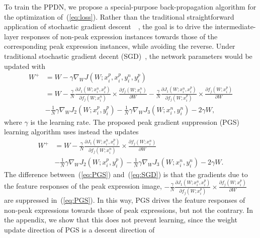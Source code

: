 \documentclass[runningheads]{llncs}
\begin{document}
To train the PPDN, we propose a special-purpose back-propagation algorithm 
 for the optimization of~(\ref{eq:loss}). Rather than the traditional 
straightforward application of stochastic gradient 
descent~\cite{chopra2005learning}~\cite{schroff2015facenet}, the goal is to 
drive the intermediate-layer responses of non-peak expression instances 
towards those of the corresponding peak expression instances, while avoiding 
the reverse. Under traditional stochastic gradient decent 
(SGD)~\cite{bottou2010large}, the network parameters would be updated
with
\begin{equation}
\begin{split}
W^{+} &= W - \gamma \nabla_W J(W; x^p_{i},x^p_{i},y^n_{i},y^p_i)\\
  &= W -\frac{\gamma}{N}\frac{\partial J_{1}(W; x^n_{i},x^p_{i})}{\partial f_{j}(W;x^n_{i})}\times\frac{\partial f_{j}(W;x^n_{i})}{\partial W} - \frac{\gamma
}{N}\frac{\partial J_{1}(W; x^n_{i},x^p_{i})}{\partial f_{j}(W;x^p_{i})}\times\frac{\partial f_{j}(W;x^p_{i})}{\partial W} \\
 & - \frac{1}{N}\gamma \nabla_W J_{2}(W; x^p_{i},y^p_{i})
 - \frac{1}{N}\gamma \nabla_W J_{3}(W;x^n_{i},y^n_{i})
  - 2\gamma W,
\label{eq:SGD}
\end{split}
\end{equation}
where $\gamma$ is the learning rate. The proposed
peak gradient suppression (PGS) learning algorithm
uses instead the updates
 \begin{equation}
 \begin{split}
W^{+} 
  &= W -\frac{\gamma}{N}\frac{\partial J_{1}(W; x^n_{i},x^p_{i})}{\partial f_{j}(W;x^n_{i})}\times\frac{\partial f_{j}(W;x^n_{i})}{\partial W}  \\
 & - \frac{1}{N}\gamma \nabla_W J_{2}(W; x^p_{i},y^p_{i})
 - \frac{1}{N}\gamma \nabla_W J_{3}(W;x^n_{i},y^n_{i})
  - 2\gamma W.
 \label{eq:PGS}
 \end{split}
 \end{equation}
The difference between~(\ref{eq:PGS}) and~(\ref{eq:SGD}) is that the 
gradients due to the feature responses of the peak expression image, 
$-\frac{\gamma}{N}\frac{\partial J_{1}(W; x^n_{i},x^p_{i})}{\partial f_{j}(W;x^p_{i})}\times\frac{\partial f_{j}(W;x^p_{i})}{\partial W}$ are suppressed 
in~(\ref{eq:PGS}). In this way, PGS drives the feature responses of
non-peak expressions towards those of peak expressions, but not the
contrary. In the appendix, we show that this does not prevent learning,
since the weight update direction of PGS  is a descent direction of
\end{document}
